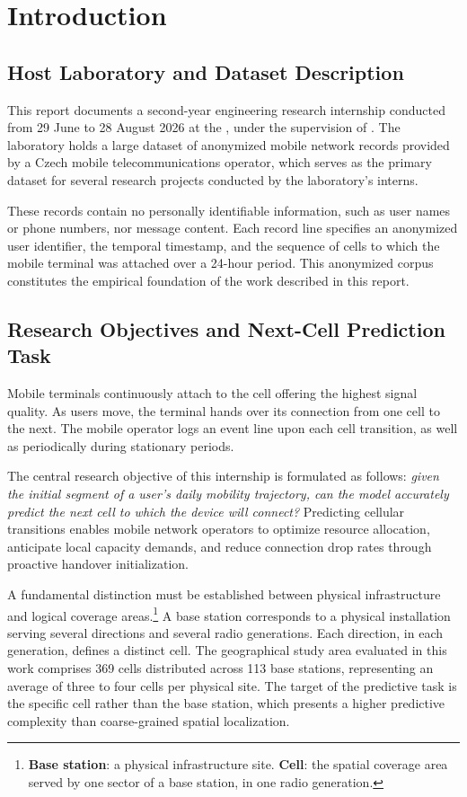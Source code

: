 \chapter{Introduction}
\label{ch:intro}

\section{Host Laboratory and Dataset Description}

This report documents a second-year engineering research internship conducted from
29 June to 28 August 2026 at the \host{}, under the supervision of \supervisor{}.
The laboratory holds a large dataset of anonymized mobile network records provided by a Czech mobile
telecommunications operator, which serves as the primary dataset for several research projects conducted by the laboratory's interns.

These records contain no personally identifiable information, such as user names or phone numbers, nor message content.
Each record line specifies an anonymized user identifier, the temporal timestamp, and the sequence of cells to which the mobile terminal was attached over a 24-hour period. This anonymized corpus constitutes the empirical foundation of the work described in this report.

\section{Research Objectives and Next-Cell Prediction Task}

Mobile terminals continuously attach to the cell offering the highest signal quality. As users move, the terminal hands over its connection from one cell to the next. The mobile operator logs an event line upon each cell transition, as well as periodically during stationary periods.

The central research objective of this internship is formulated as follows: \emph{given the initial segment of a user's daily mobility trajectory, can the model accurately predict the next cell to which the device will connect?} Predicting cellular transitions enables mobile network operators to optimize resource allocation, anticipate local capacity demands, and reduce connection drop rates through proactive handover initialization.

A fundamental distinction must be established between physical infrastructure and logical coverage areas.\footnote{\textbf{Base station}: a physical infrastructure site. \textbf{Cell}: the spatial coverage area served by one sector of a base station, in one radio generation.} A base station corresponds to a physical installation serving several directions and several radio generations. Each direction, in each generation, defines a distinct cell. The geographical study area evaluated in this work comprises 369 cells distributed across 113 base stations, representing an average of three to four cells per physical site. The target of the predictive task is the specific cell rather than the base station, which presents a higher predictive complexity than coarse-grained spatial localization.

